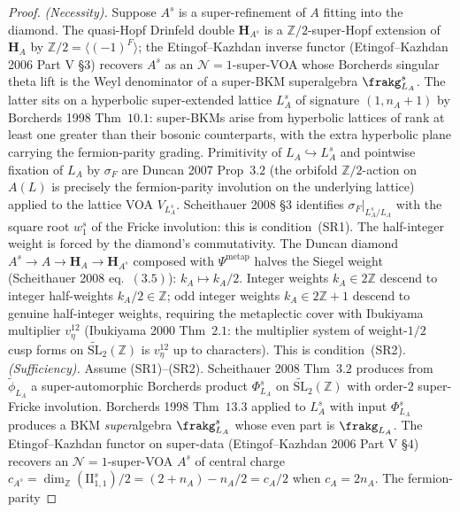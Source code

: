 \begin{proof}[Proof]
\emph{(Necessity).}
Suppose $A^{s}$ is a super-refinement of $A$ fitting into the diamond.
The quasi-Hopf Drinfeld double $\mathbf{H}_{A^{s}}$ is a
$\mathbb{Z}/2$-super-Hopf extension of $\mathbf{H}_A$ by
$\mathbb{Z}/2 = \langle(-1)^F\rangle$; the Etingof--Kazhdan inverse
functor (Etingof--Kazhdan 2006 Part V \S$3$) recovers $A^{s}$ as an
$\mathcal{N}{=}1$-super-VOA whose Borcherds singular theta lift is
the Weyl denominator of a super-BKM superalgebra $\frakg^s_{L_A}$.
The latter sits on a hyperbolic super-extended lattice
$L_A^{s}$ of signature $(1, n_A + 1)$ by Borcherds 1998 Thm~$10.1$:
super-BKMs arise from hyperbolic lattices of rank at least one
greater than their bosonic counterparts, with the extra hyperbolic
plane carrying the fermion-parity grading. Primitivity of
$L_A\hookrightarrow L_A^{s}$ and pointwise fixation of $L_A$ by
$\sigma_F$ are Duncan 2007 Prop~$3.2$ (the orbifold
$\mathbb{Z}/2$-action on $A(L)$ is precisely the fermion-parity
involution on the underlying lattice) applied to the lattice VOA
$V_{L_A^{s}}$. Scheithauer 2008 \S$3$ identifies $\sigma_F|_{L_A^{s}/L_A}$
with the square root $w_1^{s}$ of the Fricke involution: this is
condition~(SR1).
The half-integer weight is forced by the diamond's commutativity.
The Duncan diamond $A^{s}\to A \to \mathbf{H}_A \to \mathbf{H}_{A^{s}}$
composed with $\Psi^{\mathrm{metap}}$ halves the Siegel weight
(Scheithauer 2008 eq.~$(3.5)$): $k_A\mapsto k_A/2$. Integer weights
$k_A\in 2\mathbb{Z}$ descend to integer half-weights $k_A/2\in\mathbb{Z}$;
odd integer weights $k_A\in 2\mathbb{Z} + 1$ descend to genuine
half-integer weights, requiring the metaplectic cover with Ibukiyama
multiplier $v_\eta^{12}$ (Ibukiyama 2000 Thm~$2.1$: the multiplier
system of weight-$1/2$ cusp forms on $\widetilde{\mathrm{SL}}_2(\mathbb{Z})$
is $v_\eta^{12}$ up to characters). This is condition~(SR2).
\emph{(Sufficiency).}
Assume (SR1)--(SR2). Scheithauer 2008 Thm~$3.2$ produces from
$\widetilde\phi_{L_A}$ a super-automorphic Borcherds product
$\Phi^{s}_{L_A}$ on $\widetilde{\mathrm{SL}}_2(\mathbb{Z})$ with
order-$2$ super-Fricke involution. Borcherds 1998 Thm~$13.3$
applied to $L_A^{s}$ with input $\Phi^{s}_{L_A}$ produces a
BKM \emph{super}algebra $\frakg^s_{L_A}$ whose even part is
$\frakg_{L_A}$. The Etingof--Kazhdan functor on super-data
(Etingof--Kazhdan 2006 Part V \S$4$) recovers an
$\mathcal{N}{=}1$-super-VOA $A^{s}$ of central charge
$c_{A^{s}} = \dim_{\mathbb{Z}}(\mathrm{II}_{1,1}^{s})/2 =
(2 + n_A) - n_A/2 = c_A/2$ when $c_A = 2 n_A$. The fermion-parity

\end{proof}
